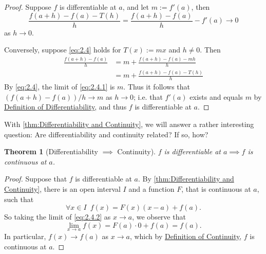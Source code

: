 \documentclass[11pt, oneside]{book}
\theoremstyle{break}
\newtheorem{thm}{Theorem}[section]
\newtheorem*{proof}{Proof}
\begin{document}
\begin{proof}
    Suppose $f$ is differentiable at $a$, and let $m := f'(a)$, then
    \begin{equation*}
        \frac{f(a + h) - f(a) - T(h)}{h} = \frac{f(a + h) - f(a)}{h} - f'(a) \to 0
    \end{equation*}
    as $h \to 0$.

    Conversely, suppose \autoref{eq:2.4} holds for $T(x) := mx$ and $h \neq 0$. Then
    \begin{align}
        \frac{f(a + h) - f(a)}{h} &= m + \frac{f(a + h) - f(a) - mh}{h} \nonumber \\
                &= m + \frac{f(a + h) - f(a) - T(h)}{h} \label{eq:2.4.1}
    \end{align}
    By \autoref{eq:2.4}, the limit of \autoref{eq:2.4.1} is $m$. Thus it follows that $\left( f(a + h) - f(a) \right) / h \to m$ as $h \to 0$; i.e. that $f'(a)$ exists and equals $m$ by \hyperref[defn:Differentiable]{Definition of Differentiability}, and thus $f$ is differentiable at $a$.
\end{proof}

With \autoref{thm:Differentiability and Continuity}, we will answer a rather interesting question: Are differentiability and continuity related? If so, how?

\begin{thm}[Differentiability $\implies$ Continuity]\label{thm:differentiability implies continuity}
    $f$ is differentiable at $a \implies f$ is continuous at $a$.
\end{thm}

\begin{proof}
    Suppose that $f$ is differentiable at $a$. By \autoref{thm:Differentiability and Continuity}, there is an open interval $I$ and a function $F$, that is continuous at $a$, such that
    \begin{equation}\label{eq:2.4.2}
        \forall x \in I \enspace f(x) = F(x)(x - a) + f(a).
    \end{equation}
    So taking the limit of \autoref{eq:2.4.2} as $x \to a$, we observe that
    \begin{equation*}
        \lim_{x \to a} f(x) = F(a) \cdot 0 + f(a) = f(a).
    \end{equation*}
    In particular, $f(x) \to f(a)$ as $x \to a$, which by \hyperref[defn:Continuity]{Definition of Continuity}, $f$ is continuous at $a$.
\end{proof}
\end{document}
